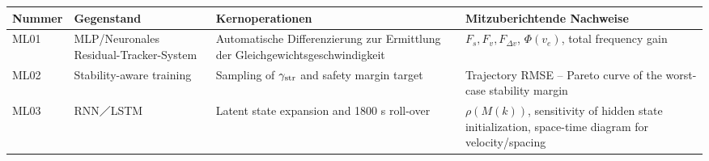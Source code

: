 \documentclass[11pt,a4paper,openany]{book}
\numberwithin{equation}{chapter}
\numberwithin{figure}{chapter}
\numberwithin{table}{chapter}
\begin{document}
\begin{center}
\small
{}
\label{tab:ml-experiments}
\begin{tabular}{p{1.0cm}p{2.9cm}p{4.0cm}p{5.1cm}}
\toprule
\textbf{Nummer} & \textbf{Gegenstand} & \textbf{Kernoperationen} & \textbf{Mitzuberichtende Nachweise} \\
\midrule
ML01 &




MLP/Neuronales Residual-Tracker-System




&




Automatische Differenzierung zur Ermittlung der Gleichgewichtsgeschwindigkeit




&






$F_s,F_v,F_{\Delta v}$, $\Phi(v_e)$, total frequency gain





\\
ML02 &






Stability-aware training






&






Sampling of $\gamma_{\rm str}$ and safety margin target






&






Trajectory RMSE – Pareto curve of the worst-case stability margin





\\
ML03 & RNN／LSTM &






Latent state expansion and 1800 s roll-over






&






$\rho(M(k))$, sensitivity of hidden state initialization, space-time diagram for velocity/spacing






\end{tabular}
\end{center}
\end{document}
